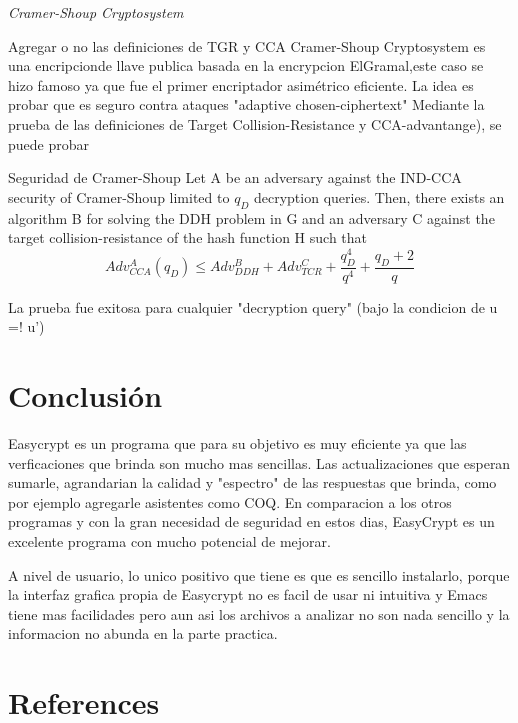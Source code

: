 \documentclass[runningheads,a4paper]{llncs}
\begin{document}
\centerline{\emph{Cramer-Shoup Cryptosystem}}

Agregar o no las definiciones de TGR y CCA
Cramer-Shoup Cryptosystem es una encripcionde llave publica basada en la encrypcion ElGramal,este caso se hizo famoso ya que fue el primer encriptador asimétrico eficiente. La idea es probar que es seguro contra ataques "adaptive chosen-ciphertext"
Mediante la prueba de las definiciones de Target Collision-Resistance y CCA-advantange), se puede probar
\begin{theorem}{Seguridad de Cramer-Shoup}
Let A be an adversary against the IND-CCA security
of Cramer-Shoup limited to $q_D$ decryption queries. Then, there exists an algorithm B for solving the
DDH problem in G and an adversary C against the target collision-resistance of the hash function H
such that
\[Adv_{CCA}^A(q_D) \leq Adv_{DDH}^B + Adv_{TCR}^C + \frac{q_D^4}{q^4} + \frac{q_D + 2}{q}\]
\end{theorem}
La prueba fue exitosa para cualquier "decryption query" (bajo la condicion de u =! u')\cite{article3}


\section{Conclusión}


Easycrypt es un programa que para su objetivo es muy eficiente ya que las verficaciones que brinda son mucho mas sencillas. Las actualizaciones que esperan sumarle, agrandarian la calidad y "espectro" de las respuestas que brinda, como por ejemplo agregarle asistentes como COQ. En comparacion a los otros programas y con la gran necesidad de seguridad en estos dias, EasyCrypt es un excelente programa con mucho potencial de mejorar.

A nivel de usuario, lo unico positivo que tiene es que es sencillo instalarlo, porque la interfaz grafica propia de Easycrypt no es facil de usar ni intuitiva y Emacs tiene mas facilidades pero aun asi los archivos a analizar no son nada sencillo y la informacion no abunda en la parte practica.



\section{References}
\end{document}
